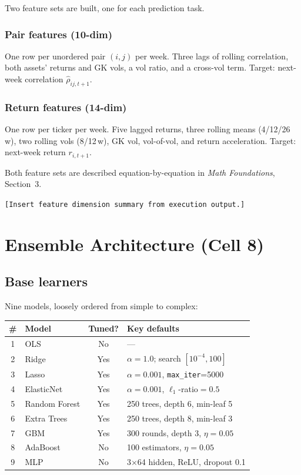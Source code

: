\documentclass[11pt]{article}
\newcommand{\code}[1]{\texttt{#1}}
\newcommand{\placeholder}[1]{\textcolor{red!70!black}{\texttt{[#1]}}}
\begin{document}
Two feature sets are built, one for each prediction task.

\subsubsection*{Pair features (10-dim)}

One row per unordered pair $(i,j)$ per week.
Three lags of rolling correlation, both assets' returns and GK vols,
a vol ratio, and a cross-vol term.
Target: next-week correlation $\hat\rho_{ij,t+1}$.

\subsubsection*{Return features (14-dim)}

One row per ticker per week.
Five lagged returns, three rolling means (4/12/26\,w),
two rolling vols (8/12\,w), GK vol, vol-of-vol, and return acceleration.
Target: next-week return $r_{i,t+1}$.

Both feature sets are described equation-by-equation in
\textit{Math Foundations}, Section~3.

\placeholder{Insert feature dimension summary from execution output.}

\section{Ensemble Architecture (Cell 8)}\label{sec:ensemble}

\subsection{Base learners}

Nine models, loosely ordered from simple to complex:

\begin{center}
\renewcommand{\arraystretch}{1.15}
\begin{tabular}{@{}clcl@{}}
\toprule
\# & \textbf{Model} & \textbf{Tuned?} & \textbf{Key defaults}\\
\midrule
1 & OLS         & No  & ---\\
2 & Ridge       & Yes & $\alpha=1.0$; search $[10^{-4},100]$\\
3 & Lasso       & Yes & $\alpha=0.001$, \code{max\_iter}=5000\\
4 & ElasticNet  & Yes & $\alpha=0.001$, $\ell_1$-ratio$=0.5$\\
5 & Random Forest & Yes & 250 trees, depth 6, min-leaf 5\\
6 & Extra Trees & Yes & 250 trees, depth 8, min-leaf 3\\
7 & GBM         & Yes & 300 rounds, depth 3, $\eta=0.05$\\
8 & AdaBoost    & No  & 100 estimators, $\eta=0.05$\\
9 & MLP         & No  & 3$\times$64 hidden, ReLU, dropout 0.1\\
\bottomrule
\end{tabular}
\end{center}
\end{document}
